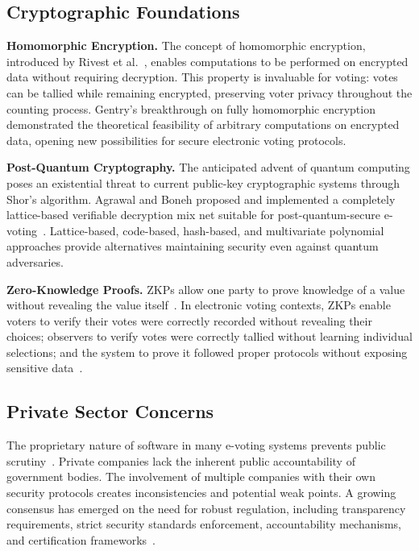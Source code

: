 \documentclass[sigconf,nonacm]{acmart}
\begin{document}
\subsection{Cryptographic Foundations}

\textbf{Homomorphic Encryption.} The concept of homomorphic encryption, introduced by
Rivest et al.~\cite{rivest1978data}, enables computations to be performed on encrypted
data without requiring decryption. This property is invaluable for voting: votes can be
tallied while remaining encrypted, preserving voter privacy throughout the counting
process. Gentry's breakthrough on fully homomorphic encryption~\cite{gentry2009fully}
demonstrated the theoretical feasibility of arbitrary computations on encrypted data,
opening new possibilities for secure electronic voting protocols.

\textbf{Post-Quantum Cryptography.} The anticipated advent of quantum computing poses
an existential threat to current public-key cryptographic systems through Shor's
algorithm. Agrawal and Boneh proposed and implemented a completely lattice-based
verifiable decryption mix net suitable for post-quantum-secure
e-voting~\cite{agrawal2010efficient}. Lattice-based, code-based, hash-based, and
multivariate polynomial approaches provide alternatives maintaining security even against
quantum adversaries.

\textbf{Zero-Knowledge Proofs.} ZKPs allow one party to prove knowledge of a value
without revealing the value itself~\cite{kelly2019zkp}. In electronic voting contexts,
ZKPs enable voters to verify their votes were correctly recorded without revealing their
choices; observers to verify votes were correctly tallied without learning individual
selections; and the system to prove it followed proper protocols without exposing
sensitive data~\cite{singer2023beyond}.

\subsection{Private Sector Concerns}

The proprietary nature of software in many e-voting systems prevents public
scrutiny~\cite{alshammari2012understanding}. Private companies lack the inherent public
accountability of government bodies. The involvement of multiple companies with their
own security protocols creates inconsistencies and potential weak points. A growing
consensus has emerged on the need for robust regulation, including transparency
requirements, strict security standards enforcement, accountability mechanisms, and
certification frameworks~\cite{alshammari2012understanding}.
\end{document}
